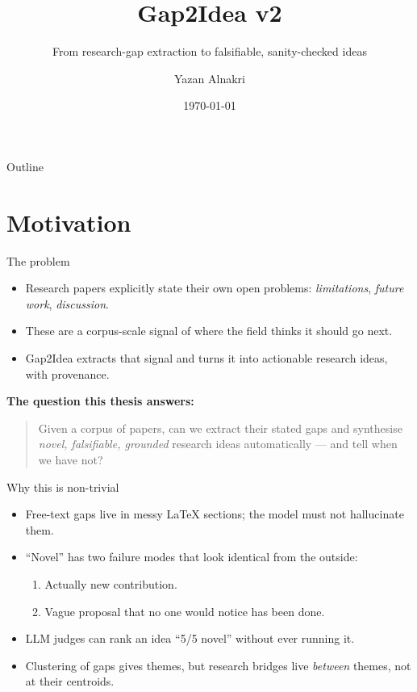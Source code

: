 \documentclass[10pt,aspectratio=169]{beamer}
\title{Gap2Idea v2}
\subtitle{From research-gap extraction to falsifiable, sanity-checked ideas}
\author{Yazan Alnakri}
\institute{Master's Thesis Defence}
\date{\today}
\begin{document}
\maketitle

\begin{frame}{Outline}
  \tableofcontents
\end{frame}

\section{Motivation}

\begin{frame}{The problem}
  \begin{itemize}
    \item Research papers explicitly state their own \alert{open problems}:
      \emph{limitations}, \emph{future work}, \emph{discussion}.
    \item These are a corpus-scale signal of where the field thinks it should go next.
    \item \alert{Gap2Idea} extracts that signal and turns it into actionable
      research ideas, with provenance.
  \end{itemize}
  \vspace{0.5em}
  \pause
  \textbf{The question this thesis answers:}
  \begin{quote}
    Given a corpus of papers, can we extract their stated gaps and
    synthesise \emph{novel, falsifiable, grounded} research ideas
    automatically --- and tell when we have not?
  \end{quote}
\end{frame}

\begin{frame}{Why this is non-trivial}
  \begin{itemize}
    \item Free-text gaps live in messy LaTeX sections; the model must not
      hallucinate them.
    \item ``Novel'' has two failure modes that look identical from the
      outside:
      \begin{enumerate}
        \item Actually new contribution.
        \item Vague proposal that no one would notice has been done.
      \end{enumerate}
    \item LLM judges can rank an idea ``5/5 novel'' without ever running it.
    \item Clustering of gaps gives \alert{themes}, but research bridges
      live \emph{between} themes, not at their centroids.
  \end{itemize}
\end{frame}
\end{document}
